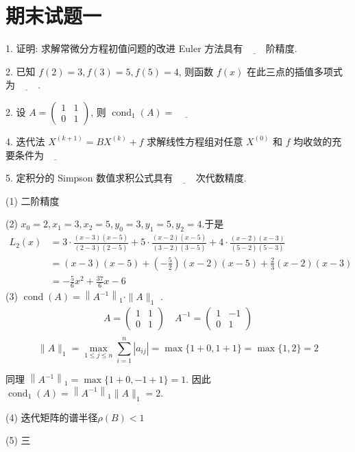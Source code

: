 \newpage
\section{期末试题一}
\begin{tcolorbox}[breakable,
		colframe=white!10!jingga, coltitle=white!90!jingga, colback=white!95!jingga, coltext=black, colbacktitle=white!10!jingga, enhanced, fonttitle=\bfseries,fontupper=\normalsize, attach boxed title to top left={yshift=-2mm}, before skip=8pt, after skip=8pt,
		title=填空题]
 

1. 证明: 求解常微分方程初值问题的改进 Euler 方法具有$\underline{\hspace{1cm}}$阶精度.
    
2. 已知 $ f(2)=3, f(3)=5, f(5)=4 $, 则函数 $ f(x) $ 在此三点的插值多项式为$\underline{\hspace{1cm}}$.

2. 设 $ A=\left(\begin{array}{ll}1 & 1 \\ 0 & 1\end{array}\right) $, 则 $ \operatorname{cond}_{1}(A)= \underline{\hspace{1cm}}$

4. 迭代法 $ X^{(k+1)}=B X^{(k)}+f $ 求解线性方程组对任意 $ X^{(0)} $ 和 $ f $ 均收敛的充要条件为$\underline{\hspace{1cm}}$

5. 定积分的 Simpson 数值求积公式具有$\underline{\hspace{1cm}}$次代数精度.

 \tcblower

(1) 二阶精度

(2) $x_{0}  =2, x_{1}=3, x_{2}=5 , y_{0}  =3, y_{1}=5, y_{2}=4 $.于是
$$
\begin{aligned}
L_{2}(x) & =3 \cdot \frac{(x-3)(x-5)}{(2-3)(2-5)}+5 \cdot \frac{(x-2)(x-5)}{(3-2)(3-5)}+4 \cdot \frac{(x-2)(x-3)}{(5-2)(5-3)} \\
& =(x-3)(x-5)+(-\frac{5}{2})(x-2)(x-5)+\frac{2}{3}(x-2)(x-3) \\
& =-\frac{5}{6} x^{2}+\frac{37}{6} x-6
\end{aligned}
$$
(3) $\operatorname{cond}(A)=\left\|A^{-1}\right\|_{1} \cdot\|A\|_{1}$ .
$$
\begin{array}{l}
A=\left(\begin{array}{ll}
1 & 1 \\
0 & 1
\end{array}\right) \quad A^{-1}=\left(\begin{array}{cc}
1 & -1 \\
0 & 1
\end{array}\right) \\
\end{array}
$$
$$\|A\|_{1}=\max _{1 \leqslant j \leqslant n} \sum_{i=1}^{n}\left|a_{i j}\right|=\max \{1+0,1+1\} 
=\max \{1,2\}=2 $$

同理 $ \left\|A^{-1}\right\|_{1}=\max \{1+0,-1+1\}=1 $.
因此 $ \operatorname{cond}_{1}(A)=\left\|A^{-1}\right\|_{1}\|A\|_{1}=2 $.

(4) 迭代矩阵的谱半径$\rho(B)<1$

(5) 三
\end{tcolorbox}

